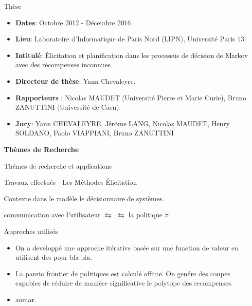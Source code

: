 \documentclass{beamer}
\newcommand{\imp}[1]{{\color{red}{#1}}}
\begin{document}
{\begin{frame}{Thèse}
\begin{itemize} 
\item \textbf{Dates}: Octobre 2012 - Décembre 2016
\item \textbf{Lieu}: Laboratoire d’Informatique de Paris Nord (LIPN),
Université Paris 13.
\item \textbf{Intitulé}: Élicitation et planification dans les processus de
décision de Markov avec des récompenses inconnues.
\item \textbf{Directeur de thèse}: Yann Chevaleyre.
\item \textbf{Rapporteurs} : Nicolas MAUDET (Université Pierre et
Marie Curie), Bruno ZANUTTINI (Université de Caen).
\item \textbf{Jury}: Yann CHEVALEYRE, Jérôme LANG, Nicolas
MAUDET, Henry SOLDANO, Paolo VIAPPIANI, Bruno
ZANUTTINI
\end{itemize}
	
\end{frame}

\begin{frame}
	\begin{center}
	\textbf{Thèmes de Recherche}
	\end{center}
\end{frame}
{


\begin{frame}{Thémes de recherche et applications}

\end{frame}

\begin{frame}{Travaux effectués - Les Méthodes Élicitation}
\begin{block}{Contexte}
\imp{Prédire des informations incertains} dans le modèle \imp{en interrogeant} le décisionnaire de systèmes.
\begin{center}
communication avec l’utilisateur $\leftrightarrows$  $\leftrightarrows$ la politique $\pi$
\end{center}
\end{block}


\begin{block}{Approches utilisés}
\begin{itemize}
\item On a developpé une approche itérative basée sur une function de valeur en utilisent des \imp{méthodes de clustering} pour bla bla.
\item La pareto frontier de politiques est calculé offline. On genére des coupes capables de réduire de manière significative le polytope des recompenses.
\item aomar.
\end{itemize}
\end{block}


\end{frame}}}
\end{document}
